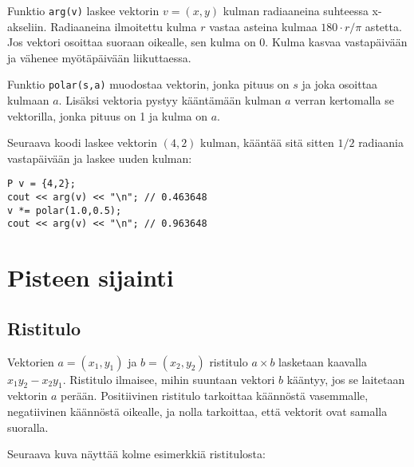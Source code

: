 Funktio \texttt{arg(v)} laskee vektorin $v=(x,y)$
kulman radiaaneina suhteessa x-akseliin.
Radiaaneina ilmoitettu kulma $r$ vastaa asteina
kulmaa $180 \cdot r/\pi$ astetta.
Jos vektori osoittaa suoraan oikealle,
sen kulma on 0.
Kulma kasvaa vastapäivään ja vähenee myötäpäivään
liikuttaessa.

Funktio \texttt{polar(s,a)} muodostaa vektorin,
jonka pituus on $s$ ja joka osoittaa kulmaan $a$.
Lisäksi vektoria pystyy kääntämään kulman $a$
verran kertomalla se vektorilla,
jonka pituus on 1 ja kulma on $a$.

Seuraava koodi laskee vektorin $(4,2)$ kulman,
kääntää sitä sitten $1/2$ radiaania vastapäivään
ja laskee uuden kulman:

\begin{lstlisting}
P v = {4,2};
cout << arg(v) << "\n"; // 0.463648
v *= polar(1.0,0.5);
cout << arg(v) << "\n"; // 0.963648
\end{lstlisting}

\section{Pisteen sijainti}

\subsection{Ristitulo}

Vektorien
$a=(x_1,y_1)$ ja $b=(x_2,y_2)$ ristitulo $a \times b$
lasketaan kaavalla $x_1 y_2 - x_2 y_1$.
Ristitulo ilmaisee, mihin suuntaan vektori $b$
kääntyy, jos se laitetaan vektorin $a$ perään.
Positiivinen ristitulo tarkoittaa käännöstä vasemmalle,
negatiivinen käännöstä oikealle, ja nolla tarkoittaa,
että vektorit ovat samalla suoralla.

Seuraava kuva näyttää kolme esimerkkiä ristitulosta:
\\
\begin{center}
\end{center}

